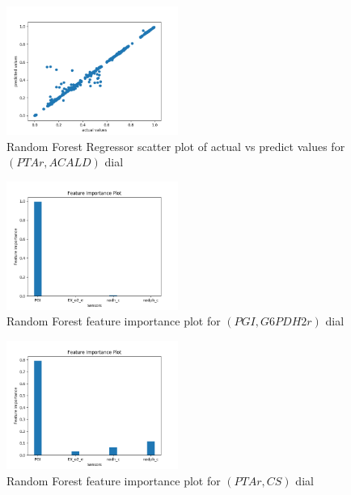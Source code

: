 \documentclass[12pt,chapterheads]{ucsd}
\begin{document}
\begin{figure}[h] 
\centering
\includegraphics[width=0.5\textwidth]{Figures/PTAr_ACALD_rfr}
\caption[Random Forest Regressor scatter plot of actual vs predict values for $(PTAr, ACALD)$ dial]
{Random Forest Regressor scatter plot of actual vs predict values for $(PTAr, ACALD)$ dial}
\label{fig:PtarAcaldRfr}
\end{figure}

\begin{figure}[h] 
\centering
\includegraphics[width=0.5\textwidth]{Figures/PGI_G6PDH2r_rfr_important_features}
\caption[Random Forest feature importance plot for $(PGI, G6PDH2r)$ dial]
{Random Forest feature importance plot for $(PGI, G6PDH2r)$ dial}
\label{fig:PgiG6pdh2rRfrImp}
\end{figure}

\begin{figure}[h] 
\centering
\includegraphics[width=0.5\textwidth]{Figures/PTAr_CS_rfr_important_features}
\caption[Random Forest feature importance plot for $(PTAr, CS)$ dial]
{Random Forest feature importance plot for $(PTAr, CS)$ dial}
\label{fig:PtarCsRfrImp}
\end{figure}
\end{document}
